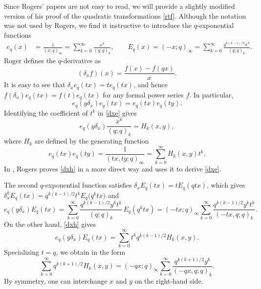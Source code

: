 \documentclass[11pt]{article}
\numberwithin{equation}{section}
\numberwithin{equation}{section}
\begin{document}
Since Rogers' papers are not easy to read, we will provide a slightly modified
version of his proof of the quadratic transformations \eqref{rtf}.
Although the notation was not used by Rogers, we find it instructive to introduce the $q$-exponential functions
\begin{align*}
e_q(x)&=\frac 1{(x;q)_\infty}=\sum_{k=0}^\infty\frac{x^k}{(q;q)_k},\qquad
E_q(x)=(-x;q)_\infty=\sum_{k=0}^\infty\frac{q^{k(k-1)/2}x^k}{(q;q)_k}.
\end{align*}
Roger defines the $q$-derivative as
\begin{equation*}(\delta_x f)(x)=\frac{f(x)-f(qx)}{x}. \end{equation*}
It is easy to see that $\delta_x e_q(tx)=t e_q(tx)$,
 and hence $f(\delta_x)e_q(tx)=f(t)e_q(tx)$ for any formal power series $f$. In particular,
\begin{equation}\label{dxe}
e_q(y\delta_x)e_q(tx)=e_q(tx)e_q(ty).\end{equation}
Identifying the coefficient of $t^k$ in \eqref{dxe} gives
\begin{equation}\label{dxh}e_q(y\delta_x)\frac{x^k}{(q;q)_k}=H_k(x,y),\end{equation}
where $H_k$ are defined by the generating function
\begin{equation}\label{eeh}e_q(tx)e_q(ty)= \frac 1{(tx,ty;q)_\infty}=\sum_{k=0}^\infty H_k(x,y)t^k.\end{equation}
In \cite{r1}, Rogers proves \eqref{dxh} in a more direct way and uses it to derive \eqref{dxe}.

The second $q$-exponential function satisfies $\delta_x E_q(tx)=t E_q(qtx)$,
which gives $\delta_x^k E_q(tx)=q^{k(k-1)/2}t^kE_q\bigl(q^ktx\bigr)$ and
\begin{equation*} e_q(y\delta_x)E_q(tx)=\sum_{k=0}^\infty\frac{q^{k(k-1)/2}y^kt^k}{(q;q)_k}\,E_q(q^ktx)
=(-tx;q)_\infty\sum_{k=0}^\infty\frac{q^{k(k-1)/2}y^kt^k}{(-tx,q;q)_k}.\end{equation*}
On the other hand, \eqref{dxh} gives
\begin{equation*}e_q(y\delta_x)E_q(tx)=\sum_{k=0}^\infty t^kq^{k(k-1)/2} H_k(x,y). \end{equation*}
Specializing $t=q$, we obtain \cite[Section~6, equation~(1)]{r2} in the form
\begin{equation}\label{rhi}\sum_{k=0}^\infty q^{k(k+1)/2} H_k(x,y)=(-qx;q)_\infty\sum_{k=0}^\infty\frac{q^{k(k+1)/2}y^k}{(-qx,q;q)_k}.
\end{equation}
By symmetry, one can interchange $x$ and $y$ on the right-hand side.
\end{document}
